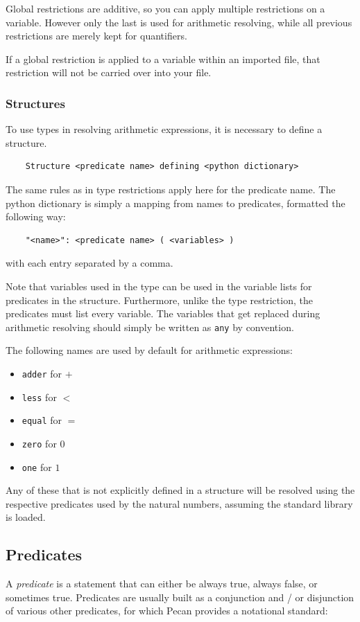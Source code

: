 \documentclass{report}
\begin{document}
Global restrictions are additive, so you can apply multiple restrictions on a variable.
However only the last is used for arithmetic resolving, while all previous restrictions are merely kept for quantifiers.

If a global restriction is applied to a variable within an imported file, that restriction will not be carried over into your file.

\subsubsection{Structures}
To use types in resolving arithmetic expressions, it is necessary to define a structure.
\begin{verbatim}
    Structure <predicate name> defining <python dictionary>
\end{verbatim}
The same rules as in type restrictions apply here for the predicate name.
The python dictionary is simply a mapping from names to predicates, formatted the following way:
\begin{verbatim}
    "<name>": <predicate name> ( <variables> )
\end{verbatim}
with each entry separated by a comma.

Note that variables used in the type can be used in the variable lists for predicates in the structure.
Furthermore, unlike the type restriction, the predicates must list every variable.
The variables that get replaced during arithmetic resolving should simply be written as \verb+any+ by convention.

The following names are used by default for arithmetic expressions:
\begin{itemize}
    \item \verb+adder+ for \(+\)
    \item \verb+less+ for \(<\)
    \item \verb+equal+ for \(=\)
    \item \verb+zero+ for \(0\)
    \item \verb+one+ for \(1\)
\end{itemize}
Any of these that is not explicitly defined in a structure will be resolved using the respective predicates used by the natural numbers, assuming the standard library is loaded.


\subsection{Predicates}
A \emph{predicate} is a statement that can either be always true, always false, or sometimes true.
Predicates are usually built as a conjunction and / or disjunction of various other predicates, for which Pecan provides a notational standard:
\end{document}
